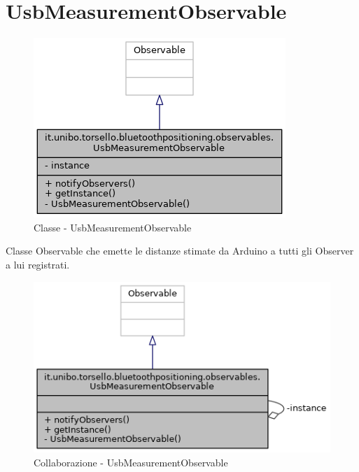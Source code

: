 \newpage
\section{UsbMeasurementObservable}
\begin{figure}[ph]
	\centering
	\includegraphics[width=0.6\linewidth]{img/uml/class/classit_1_1unibo_1_1torsello_1_1bluetoothpositioning_1_1observables_1_1UsbMeasurementObservable__inherit__graph.png}
	\caption{Classe - UsbMeasurementObservable}
\end{figure}

Classe Observable che emette le distanze stimate da Arduino a tutti gli Observer a lui registrati.

\begin{figure}[ph]
	\centering
	\includegraphics[width=0.8\linewidth]{img/uml/class/classit_1_1unibo_1_1torsello_1_1bluetoothpositioning_1_1observables_1_1UsbMeasurementObservable__coll__graph.png}
	\caption{Collaborazione - UsbMeasurementObservable}
\end{figure}

\newpage
